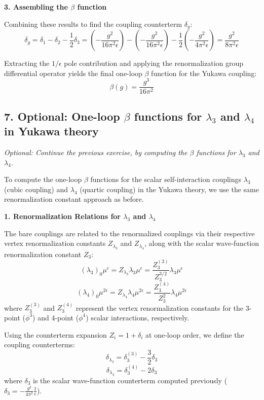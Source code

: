 \textbf{3. Assembling the $\beta$ function}

Combining these results to find the coupling counterterm $\delta_g$:
\[
    \delta_g = \delta_1 - \delta_2 - \frac{1}{2}\delta_3 = \left( -\frac{g^2}{16\pi^2\epsilon} \right) - \left( -\frac{g^2}{16\pi^2\epsilon} \right) - \frac{1}{2}\left( -\frac{g^2}{4\pi^2\epsilon} \right) = \frac{g^2}{8\pi^2 \epsilon}
\]

Extracting the $1/\epsilon$ pole contribution and applying the renormalization group differential operator yields the final one-loop $\beta$ function for the Yukawa coupling:
\[
    \beta(g) = \frac{g^3}{16\pi^2}
\]


\subsection*{7. Optional: One-loop $\beta$ functions for $\lambda_3$ and $\lambda_4$ in Yukawa theory}

\begin{center}
    \textit{Optional: Continue the previous exercise, by computing the $\beta$ functions for $\lambda_3$ and $\lambda_4$.}
\end{center}

To compute the one-loop $\beta$ functions for the scalar self-interaction couplings $\lambda_3$ (cubic coupling) and $\lambda_4$ (quartic coupling) in the Yukawa theory, we use the same renormalization constant approach as before.

\textbf{1. Renormalization Relations for $\lambda_3$ and $\lambda_4$}

The bare couplings are related to the renormalized couplings via their respective vertex renormalization constants $Z_{\lambda_3}$ and $Z_{\lambda_4}$, along with the scalar wave-function renormalization constant $Z_3$:
\[
    (\lambda_3)_0 \mu^\epsilon = Z_{\lambda_3} \lambda_3 \mu^\epsilon = \frac{Z_3^{(3)}}{Z_3^{3/2}} \lambda_3 \mu^\epsilon
\]
\[
    (\lambda_4)_0 \mu^{2\epsilon} = Z_{\lambda_4} \lambda_4 \mu^{2\epsilon} = \frac{Z_3^{(4)}}{Z_3^2} \lambda_4 \mu^{2\epsilon}
\]
where $Z_3^{(3)}$ and $Z_3^{(4)}$ represent the vertex renormalization constants for the 3-point ($\phi^3$) and 4-point ($\phi^4$) scalar interactions, respectively.

Using the counterterm expansion $Z_i = 1 + \delta_i$ at one-loop order, we define the coupling counterterms:
\[
    \delta_{\lambda_3} = \delta_3^{(3)} - \frac{3}{2}\delta_3
\]
\[
    \delta_{\lambda_4} = \delta_3^{(4)} - 2\delta_3
\]
where $\delta_3$ is the scalar wave-function counterterm computed previously ($\delta_3 = -\frac{g^2}{4\pi^2}\frac{1}{\epsilon}$).

